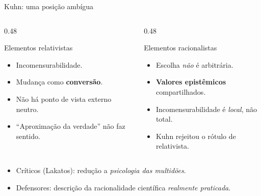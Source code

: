 \documentclass[aspectratio=169]{beamer}
\newcommand{\impt}[1]{\textcolor{maccent}{\textbf{#1}}}
\begin{document}
\begin{frame}{Kuhn: uma posi\c c\~ao amb\'igua}
\begin{columns}[T]
\begin{column}{0.48\textwidth}
\begin{alertblock}{Elementos relativistas}
\begin{itemize}
    \item Incomensurabilidade.
    \item Mudan\c ca como \impt{convers\~ao}.
    \item N\~ao h\'a ponto de vista externo neutro.
    \item ``Aproxima\c c\~ao da verdade'' n\~ao faz sentido.
\end{itemize}
\end{alertblock}
\end{column}
\begin{column}{0.48\textwidth}
\begin{block}{Elementos racionalistas}
\begin{itemize}
    \item Escolha \emph{n\~ao} \'e arbitr\'aria.
    \item \impt{Valores epist\^emicos} compartilhados.
    \item Incomensurabilidade \'e \emph{local}, n\~ao total.
    \item Kuhn rejeitou o r\'otulo de relativista.
\end{itemize}
\end{block}
\end{column}
\end{columns}
\vspace{0.4cm}
\begin{itemize}
    \item Cr\'iticos (Lakatos): redu\c c\~ao a \emph{psicologia das multid\~oes}.
    \item Defensores: descri\c c\~ao da racionalidade cient\'ifica \emph{realmente praticada}.
\end{itemize}
\end{frame}
\end{document}
